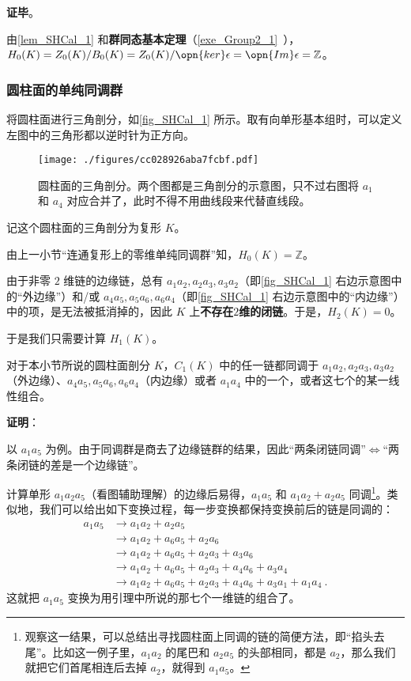 \textbf{证毕}。

由\autoref{lem_SHCal_1} 和\textbf{群同态基本定理}（\autoref{exe_Group2_1}~），$H_0(K)=Z_0(K)/B_0(K)=Z_0(K)/\opn{ker}\epsilon=\opn{Im}\epsilon=\mathbb{Z}$。



\subsubsection{圆柱面的单纯同调群}

将圆柱面进行三角剖分，如\autoref{fig_SHCal_1} 所示。取有向单形基本组时，可以定义左图中的三角形都以逆时针为正方向。

\begin{figure}[ht]
\centering
\texttt{[image: ./figures/cc028926aba7fcbf.pdf]}
\caption{圆柱面的三角剖分。两个图都是三角剖分的示意图，只不过右图将 $a_1$ 和 $a_4$ 对应合并了，此时不得不用曲线段来代替直线段。} \label{fig_SHCal_1}
\end{figure}

记这个圆柱面的三角剖分为复形 $K$。

由上一小节“连通复形上的零维单纯同调群”知，$H_0(K)=\mathbb{Z}$。

由于非零 $2$ 维链的边缘链，总有 $a_1a_2, a_2a_3, a_3a_2$（即\autoref{fig_SHCal_1} 右边示意图中的“外边缘”）和/或 $a_4a_5, a_5a_6, a_6a_4$（即\autoref{fig_SHCal_1} 右边示意图中的“内边缘”）中的项，是无法被抵消掉的，因此 $K$ 上\textbf{不存在}$2$\textbf{维的闭链}。于是，$H_2(K)=0$。

于是我们只需要计算 $H_1(K)$。

\begin{lemma}{}\label{lem_SHCal_2}
对于本小节所说的圆柱面剖分 $K$，$C_1(K)$ 中的任一链都同调于 $a_1a_2, a_2a_3, a_3a_2$（外边缘）、$a_4a_5, a_5a_6, a_6a_4$（内边缘）或者 $a_1a_4$ 中的一个，或者这七个的某一线性组合。
\end{lemma}

\textbf{证明}：

以 $a_1a_5$ 为例。由于同调群是商去了边缘链群的结果，因此“两条闭链同调”$\iff$“两条闭链的差是一个边缘链”。

计算单形 $a_1a_2a_5$（看图辅助理解）的边缘后易得，$a_1a_5$ 和 $a_1a_2+a_2a_5$ 同调\footnote{观察这一结果，可以总结出寻找圆柱面上同调的链的简便方法，即“掐头去尾”。比如这一例子里，$a_1a_2$ 的尾巴和 $a_2a_5$ 的头部相同，都是 $a_2$，那么我们就把它们首尾相连后去掉 $a_2$，就得到 $a_1a_5$。}。类似地，我们可以给出如下变换过程，每一步变换都保持变换前后的链是同调的：
\begin{equation}\label{eq_SHCal_1}
\begin{aligned}
a_1a_5&\to a_1a_2+a_2a_5\\
&\to a_1a_2+a_6a_5+a_2a_6\\
&\to a_1a_2+a_6a_5+a_2a_3+a_3a_6\\&
\to a_1a_2+a_6a_5+a_2a_3+a_4a_6+a_3a_4\\
&\to a_1a_2+a_6a_5+a_2a_3+a_4a_6+a_3a_1+a_1a_4~.
\end{aligned}
\end{equation}
这就把 $a_1a_5$ 变换为用引理中所说的那七个一维链的组合了。


